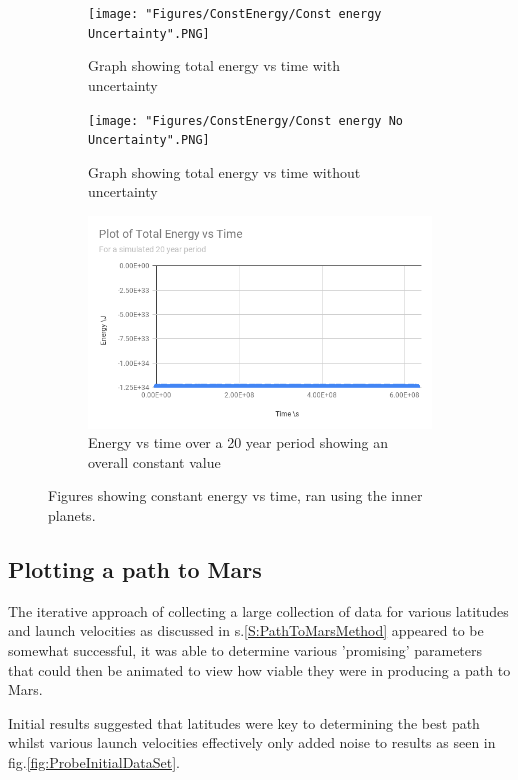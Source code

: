 \documentclass{article}
\begin{document}
                \begin{figure}[!ht]
                    \centering
                    \begin{subfigure}{0.5\textwidth}
                        \centering
                        \texttt{[image: "Figures/ConstEnergy/Const energy Uncertainty".PNG]}
                        \caption{Graph showing total energy vs time with\\ uncertainty}
                        \label{subFig:ConstEnergyGraph}
                    \end{subfigure}%
                    \begin{subfigure}{0.5\textwidth}
                        \centering
                        \texttt{[image: "Figures/ConstEnergy/Const energy No Uncertainty".PNG]}
                        \caption{Graph showing total energy vs time without \\uncertainty}
                        \label{subFig:ConstEnergyNoUncertainty}
                    \end{subfigure}
                    \begin{subfigure}{0.5\textwidth}
                        \centering
                        \includegraphics[width=0.75\linewidth]{Figures/ConstEnergy/ConstEnergy20yrs.png}
                        \caption{Energy vs time over a 20 year period showing an overall constant value}
                        \label{subFig:ConstEnergy20Yr}
                    \end{subfigure}
                    \caption{Figures showing constant energy vs time, ran using the inner planets.}
                \end{figure}


            \pagebreak
            \subsection{Plotting a path to Mars}
                The iterative approach of collecting a large collection of data for various 
                latitudes and launch velocities as discussed in s.\ref{S:PathToMarsMethod} appeared to 
                be somewhat successful, it was able to determine various 'promising' parameters that 
                could then be animated to view how viable they were in producing a path to Mars.
                \par
                Initial results suggested that latitudes were key to determining the best path 
                whilst various launch velocities effectively only added noise to results as seen in
                fig.\ref{fig:ProbeInitialDataSet}.
                
\end{document}
